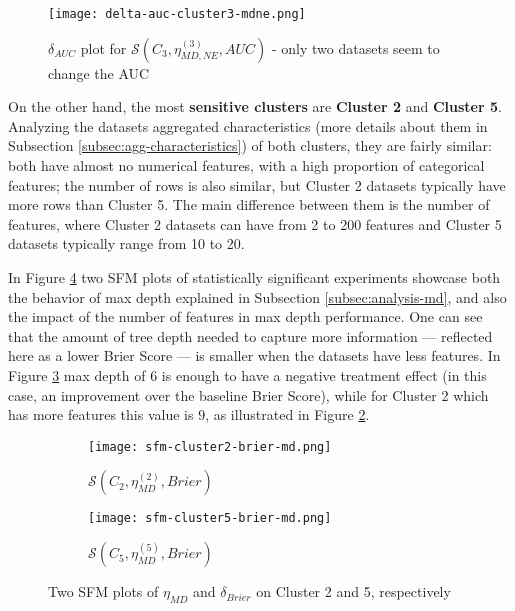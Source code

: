 \begin{figure}[H]
    \centering
    \texttt{[image: delta-auc-cluster3-mdne.png]}
    \caption{$\delta_{AUC}$ plot for $\mathcal{S}(C_3, \eta^{(3)}_{MD, NE}, AUC)$ - only two datasets seem to change the AUC}
    \label{fig:delta-auc-cluster3-mdne}
\end{figure}

On the other hand, the most \textbf{sensitive clusters} are \textbf{Cluster 2} and \textbf{Cluster 5}. Analyzing the datasets aggregated characteristics (more details about them in Subsection \ref{subsec:agg-characteristics}) of both clusters, they are fairly similar: both have almost no numerical features, with a high proportion of categorical features; the number of rows is also similar, but Cluster 2 datasets typically have more rows than Cluster 5. The main difference between them is the number of features, where Cluster 2 datasets can have from 2 to 200 features and Cluster 5 datasets typically range from 10 to 20.

In Figure \ref{fig:sfm-cluster2-cluster5} two SFM plots of statistically significant experiments showcase both the behavior of max depth explained in Subsection \ref{subsec:analysis-md}, and also the impact of the number of features in max depth performance. One can see that the amount of tree depth needed to capture more information --- reflected here as a lower Brier Score --- is smaller when the datasets have less features. In Figure \ref{fig:sfm-c2c5-c5} max depth of $6$ is enough to have a negative treatment effect (in this case, an improvement over the baseline Brier Score), while for Cluster 2 which has more features this value is $9$, as illustrated in Figure \ref{fig:sfm-c2c5-c2}.


\begin{figure}[!h]
    \centering
    \begin{subfigure}[b]{0.49\textwidth}
        \centering
        \texttt{[image: sfm-cluster2-brier-md.png]}
        \caption{$\mathcal{S}(C_2, \eta^{(2)}_{MD}, Brier)$}
        \label{fig:sfm-c2c5-c2}
    \end{subfigure}
    \hfill
    \begin{subfigure}[b]{0.49\textwidth}
        \centering
        \texttt{[image: sfm-cluster5-brier-md.png]}
        \caption{$\mathcal{S}(C_5, \eta^{(5)}_{MD}, Brier)$}
        \label{fig:sfm-c2c5-c5}
    \end{subfigure}
    \hfill
       \caption{Two SFM plots of $\eta_{MD}$ and $\delta_{Brier}$ on Cluster 2 and 5, respectively}
       \label{fig:sfm-cluster2-cluster5}
\end{figure}


